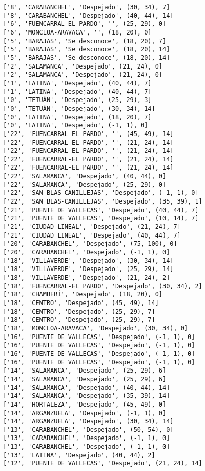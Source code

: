 \documentclass[11pt]{article}
\begin{document}
\begin{Verbatim}[commandchars=\\\{\}]
['8', 'CARABANCHEL', 'Despejado', (30, 34), 7]
['8', 'CARABANCHEL', 'Despejado', (40, 44), 14]
['6', 'FUENCARRAL-EL PARDO', '', (25, 29), 0]
['6', 'MONCLOA-ARAVACA', '', (18, 20), 0]
['5', 'BARAJAS', 'Se desconoce', (18, 20), 7]
['5', 'BARAJAS', 'Se desconoce', (18, 20), 14]
['5', 'BARAJAS', 'Se desconoce', (18, 20), 14]
['2', 'SALAMANCA', 'Despejado', (21, 24), 0]
['2', 'SALAMANCA', 'Despejado', (21, 24), 0]
['1', 'LATINA', 'Despejado', (40, 44), 7]
['1', 'LATINA', 'Despejado', (40, 44), 7]
['0', 'TETUÁN', 'Despejado', (25, 29), 3]
['0', 'TETUÁN', 'Despejado', (30, 34), 14]
['0', 'LATINA', 'Despejado', (18, 20), 7]
['0', 'LATINA', 'Despejado', (-1, 1), 0]
['22', 'FUENCARRAL-EL PARDO', '', (45, 49), 14]
['22', 'FUENCARRAL-EL PARDO', '', (21, 24), 14]
['22', 'FUENCARRAL-EL PARDO', '', (21, 24), 14]
['22', 'FUENCARRAL-EL PARDO', '', (21, 24), 14]
['22', 'FUENCARRAL-EL PARDO', '', (21, 24), 14]
['22', 'SALAMANCA', 'Despejado', (40, 44), 0]
['22', 'SALAMANCA', 'Despejado', (25, 29), 0]
['22', 'SAN BLAS-CANILLEJAS', 'Despejado', (-1, 1), 0]
['22', 'SAN BLAS-CANILLEJAS', 'Despejado', (35, 39), 1]
['21', 'PUENTE DE VALLECAS', 'Despejado', (40, 44), 7]
['21', 'PUENTE DE VALLECAS', 'Despejado', (10, 14), 7]
['21', 'CIUDAD LINEAL', 'Despejado', (21, 24), 7]
['21', 'CIUDAD LINEAL', 'Despejado', (40, 44), 7]
['20', 'CARABANCHEL', 'Despejado', (75, 100), 0]
['20', 'CARABANCHEL', 'Despejado', (-1, 1), 0]
['18', 'VILLAVERDE', 'Despejado', (30, 34), 14]
['18', 'VILLAVERDE', 'Despejado', (25, 29), 14]
['18', 'VILLAVERDE', 'Despejado', (21, 24), 2]
['18', 'FUENCARRAL-EL PARDO', 'Despejado', (30, 34), 2]
['18', 'CHAMBERÍ', 'Despejado', (18, 20), 0]
['18', 'CENTRO', 'Despejado', (45, 49), 14]
['18', 'CENTRO', 'Despejado', (25, 29), 7]
['18', 'CENTRO', 'Despejado', (25, 29), 7]
['18', 'MONCLOA-ARAVACA', 'Despejado', (30, 34), 0]
['16', 'PUENTE DE VALLECAS', 'Despejado', (-1, 1), 0]
['16', 'PUENTE DE VALLECAS', 'Despejado', (-1, 1), 0]
['16', 'PUENTE DE VALLECAS', 'Despejado', (-1, 1), 0]
['16', 'PUENTE DE VALLECAS', 'Despejado', (-1, 1), 0]
['14', 'SALAMANCA', 'Despejado', (25, 29), 6]
['14', 'SALAMANCA', 'Despejado', (25, 29), 6]
['14', 'SALAMANCA', 'Despejado', (40, 44), 14]
['14', 'SALAMANCA', 'Despejado', (35, 39), 14]
['14', 'HORTALEZA', 'Despejado', (45, 49), 0]
['14', 'ARGANZUELA', 'Despejado', (-1, 1), 0]
['14', 'ARGANZUELA', 'Despejado', (30, 34), 14]
['13', 'CARABANCHEL', 'Despejado', (50, 54), 0]
['13', 'CARABANCHEL', 'Despejado', (-1, 1), 0]
['13', 'CARABANCHEL', 'Despejado', (-1, 1), 0]
['13', 'LATINA', 'Despejado', (40, 44), 2]
['12', 'PUENTE DE VALLECAS', 'Despejado', (21, 24), 14]

\end{Verbatim}
\end{document}
